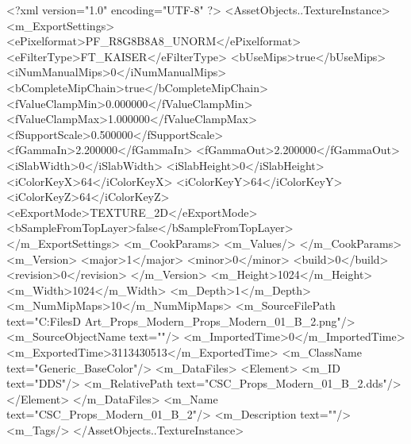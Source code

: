 <?xml version="1.0" encoding="UTF-8" ?>
<AssetObjects..TextureInstance>
	<m_ExportSettings>
		<ePixelformat>PF_R8G8B8A8_UNORM</ePixelformat>
		<eFilterType>FT_KAISER</eFilterType>
		<bUseMips>true</bUseMips>
		<iNumManualMips>0</iNumManualMips>
		<bCompleteMipChain>true</bCompleteMipChain>
		<fValueClampMin>0.000000</fValueClampMin>
		<fValueClampMax>1.000000</fValueClampMax>
		<fSupportScale>0.500000</fSupportScale>
		<fGammaIn>2.200000</fGammaIn>
		<fGammaOut>2.200000</fGammaOut>
		<iSlabWidth>0</iSlabWidth>
		<iSlabHeight>0</iSlabHeight>
		<iColorKeyX>64</iColorKeyX>
		<iColorKeyY>64</iColorKeyY>
		<iColorKeyZ>64</iColorKeyZ>
		<eExportMode>TEXTURE_2D</eExportMode>
		<bSampleFromTopLayer>false</bSampleFromTopLayer>
	</m_ExportSettings>
	<m_CookParams>
		<m_Values/>
	</m_CookParams>
	<m_Version>
		<major>1</major>
		<minor>0</minor>
		<build>0</build>
		<revision>0</revision>
	</m_Version>
	<m_Height>1024</m_Height>
	<m_Width>1024</m_Width>
	<m_Depth>1</m_Depth>
	<m_NumMipMaps>10</m_NumMipMaps>
	<m_SourceFilePath text="C:\Users\Shadow\Desktop\Working Files\3D Art\Textures\CSC_Props_Modern\Current\textures\CSC_Props_Modern_01_B_2.png"/>
	<m_SourceObjectName text=""/>
	<m_ImportedTime>0</m_ImportedTime>
	<m_ExportedTime>3113430513</m_ExportedTime>
	<m_ClassName text="Generic_BaseColor"/>
	<m_DataFiles>
		<Element>
			<m_ID text="DDS"/>
			<m_RelativePath text="CSC_Props_Modern_01_B_2.dds"/>
		</Element>
	</m_DataFiles>
	<m_Name text="CSC_Props_Modern_01_B_2"/>
	<m_Description text=""/>
	<m_Tags/>
</AssetObjects..TextureInstance>

